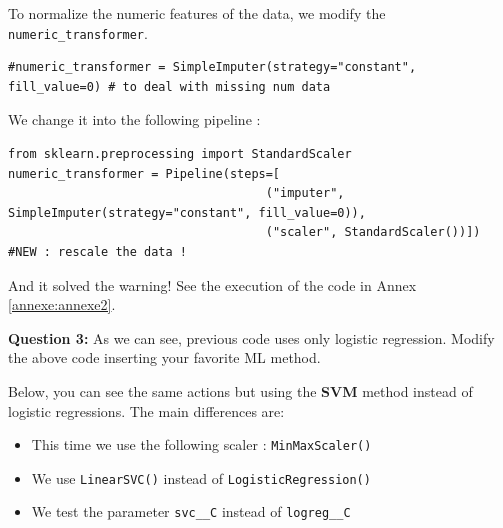 \documentclass[10pt,a4paper]{article}
\providecommand{\tightlist}{%
  \setlength{\parskip}{0pt}
  }
\theoremstyle{break}
\begin{document}
To normalize the numeric features of the data, we modify the \texttt{numeric\_transformer}.

\begin{verbatim}
#numeric_transformer = SimpleImputer(strategy="constant", fill_value=0) # to deal with missing num data
\end{verbatim}

We change it into the following pipeline :

\begin{verbatim}
from sklearn.preprocessing import StandardScaler
numeric_transformer = Pipeline(steps=[
                                    ("imputer", SimpleImputer(strategy="constant", fill_value=0)),
                                    ("scaler", StandardScaler())]) #NEW : rescale the data !
\end{verbatim}

And it solved the warning! See the execution of the code in Annex \ref{annexe:annexe2}.

\begin{tcolorbox}

\textbf{Question 3:} As we can see, previous code uses only logistic regression. Modify the above code inserting your favorite ML method.

\end{tcolorbox}

Below, you can see the same actions but using the \textbf{SVM} method instead of logistic regressions. The main differences are:

\begin{itemize}
\tightlist
\item
  This time we use the following scaler : \texttt{MinMaxScaler()}
\item
  We use \texttt{LinearSVC()} instead of \texttt{LogisticRegression()}
\item
  We test the parameter \texttt{svc\_\_C} instead of \texttt{logreg\_\_C}
\end{itemize}
\end{document}
